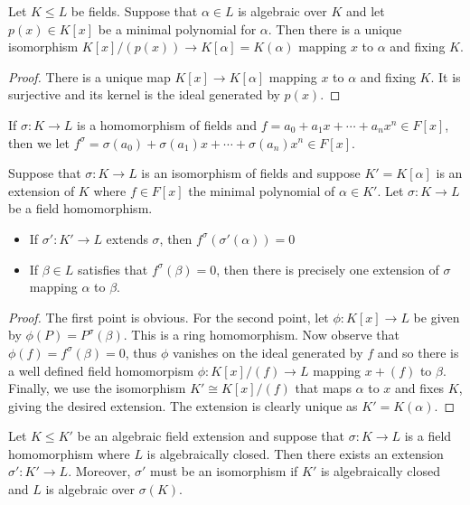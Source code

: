 \documentclass[twoside, a4paper, 10pt]{amsart}
\begin{document}
\begin{prop} Let $K \leq L$ be fields. Suppose that $\alpha \in L$ is algebraic over $K$ and let $p(x) \in K[x]$ be a minimal polynomial for $\alpha$. Then there is a unique isomorphism $K[x]/(p(x)) \to K[\alpha] = K(\alpha)$ mapping $x$ to $\alpha$ and fixing $K$. \end{prop}

\begin{proof} There is a unique map $K[x] \to K[\alpha]$ mapping $x$ to $\alpha$ and fixing $K$. It is surjective and its kernel is the ideal generated by $p(x)$. \end{proof}

If $\sigma: K \to L$ is a homomorphism of fields and $f = a_0 + a_1x + \cdots + a_nx^n \in F[x]$, then we let $f^{\sigma} = \sigma(a_0) + \sigma(a_1) x + \cdots + \sigma(a_n)x^n \in F[x]$.

\begin{lemma} Suppose that $\sigma: K \to L$ is an isomorphism of fields and suppose $K' = K[\alpha]$ is an extension of $K$ where $f \in F[x]$ the minimal polynomial of $\alpha \in K'$. Let $\sigma:K \to L$ be a field homomorphism.

\begin{itemize}
	\item If $\sigma': K' \to L$ extends $\sigma$, then $f^{\sigma}(\sigma'(\alpha)) = 0$
	\item If $\beta \in L$ satisfies that $f^{\sigma}(\beta) = 0$, then there is precisely one extension of $\sigma$ mapping $\alpha$ to $\beta$.
\end{itemize}
\end{lemma}

\begin{proof} The first point is obvious. For the second point, let $\phi:K[x] \to L$ be given by $\phi(P) = P^{\sigma}(\beta)$. This is a ring homomorphism. Now observe that $\phi(f) = f^{\sigma}(\beta) = 0$, thus $\phi$ vanishes on the ideal generated by $f$ and so there is a well defined field homomorpism $\phi:K[x]/(f) \to L$ mapping $x + (f)$ to $\beta$. Finally, we use the isomorphism $ K' \cong K[x]/(f)$ that maps $\alpha$ to $x$ and fixes $K$, giving the desired extension. The extension is clearly unique as $K' = K(\alpha)$.

\end{proof}

\begin{prop} \label{prop: extend morphism to K'} Let $K \leq K'$ be an algebraic field extension and suppose that $\sigma:K \to L$ is a field homomorphism where $L$ is algebraically closed. Then there exists an extension $\sigma':K' \to L$. Moreover, $\sigma'$ must be an isomorphism if $K'$ is algebraically closed and $L$ is algebraic over $\sigma(K)$.

\end{prop}
\end{document}
